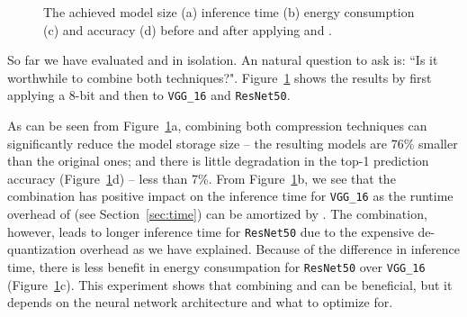 \begin{figure}[!t]
\centering
{}
\hfill
{}
\hfill
{}
\hfill
{}
\hfill
\caption{The achieved model size (a) inference time (b) energy consumption (c) and accuracy (d) before and after applying \quantization and \pruning.
}
\vspace{-3mm}
\label{fig:combine}
\end{figure}


So far we have evaluated \pruning and \quantization in isolation. An natural question to ask is: ``Is it worthwhile to combine both
techniques?". Figure~\ref{fig:combine} shows the results by first applying a 8-bit \dquantization and then \pruning to \texttt{VGG\_16} and \texttt{ResNet50}.


As can be seen from Figure~\ref{fig:combine}a, combining both compression techniques can significantly reduce the model storage size -- the
resulting models are 76\% smaller than the original ones; and there is little degradation in the top-1 prediction accuracy
(Figure~\ref{fig:combine}d) -- less than 7\%. From Figure~\ref{fig:combine}b, we see that the combination has positive impact on the
inference time for \texttt{VGG\_16} as the runtime overhead of \dquantization (see Section~\ref{sec:time}) can be amortized by \pruning.
The combination, however, leads to longer inference time for \texttt{ResNet50} due to the expensive de-quantization overhead as we have
explained. Because of the difference in inference time, there is less benefit in energy consumpation for \texttt{ResNet50} over
\texttt{VGG\_16} (Figure~\ref{fig:combine}c). This experiment shows that combining \pruning and \quantization can be beneficial, but it
depends on the neural network architecture and what to optimize for.
